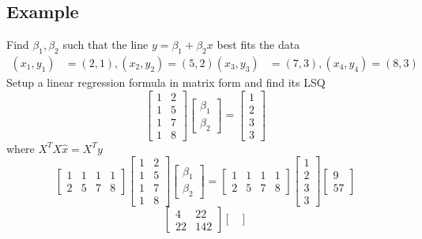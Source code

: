 \begin{enumerate}
\subsection{Example}
Find $\beta_1, \beta_2$ such that the line $y = \beta_1 + \beta_2x$ 
best fits the data 
\[
  \begin{aligned}
    (x_1, y_1) &= (2, 1), (x_2, y_2) = (5, 2)
    (x_3, y_3) &= (7, 3), (x_4, y_4) = (8, 3)
  \end{aligned}
\]
Setup a linear regression formula in matrix form and find its LSQ
\[
  \begin{bmatrix} 1 & 2 \\ 1 & 5 \\ 1 & 7 \\ 1 & 8 \end{bmatrix}
  \begin{bmatrix} \beta_1 \\ \beta_2 \end{bmatrix} = 
  \begin{bmatrix} 1 \\ 2 \\ 3 \\ 3 \end{bmatrix}
\]
where $X^TX\hat{x} = X^Ty$
\[
  \begin{bmatrix} 1 & 1 & 1 & 1 \\ 2 & 5 & 7 & 8 \end{bmatrix}
  \begin{bmatrix} 1 & 2 \\ 1 & 5 \\ 1 & 7 \\ 1 & 8 \end{bmatrix}
  \begin{bmatrix} \beta_1 \\ \beta_2 \end{bmatrix} = 
  \begin{bmatrix} 1 & 1 & 1 & 1 \\ 2 & 5 & 7 & 8 \end{bmatrix} 
  \begin{bmatrix} 1 \\ 2 \\ 3 \\ 3 \end{bmatrix} 
  \begin{bmatrix} 9 \\ 57 \end{bmatrix}
\]
\[
  \begin{bmatrix} 4 & 22 \\ 22 & 142 \end{bmatrix} \begin{bmatrix}

\end{bmatrix}\]
\end{enumerate}
